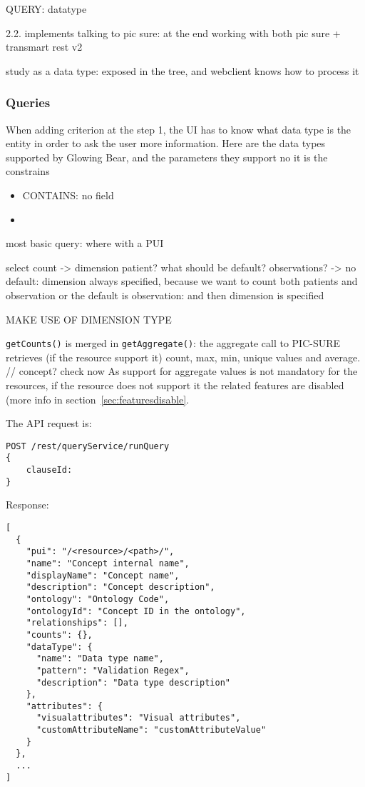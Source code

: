 QUERY: datatype


2.2. implements talking to pic sure: at the end working with both pic sure + transmart rest v2 

study as a data type: exposed in the tree, and webclient knows how to process it 

\subsubsection{Queries}

When adding criterion at the step 1, the UI has to know what data type is the entity in order to ask the user more information. Here are the data types supported by Glowing Bear, and the parameters they support no it is the constrains
\begin{itemize}
    \item CONTAINS: no field
    \item 
\end{itemize}


most basic query: where with a PUI

select count 
-> dimension patient? what should be default? observations? 
-> no default: dimension always specified, because we want to count both patients and observation 
or the default is observation: and then dimension is specified 

MAKE USE OF DIMENSION TYPE

\verb|getCounts()| is merged in \verb|getAggregate()|: the aggregate call to PIC-SURE retrieves (if the resource support it) count, max, min, unique values and average. // concept? check now
As support for aggregate values is not mandatory for the resources, if the resource does not support it the related features are disabled (more info in section~\ref{sec:featuresdisable}.


The API request is:
\begin{verbatim}
POST /rest/queryService/runQuery
{
    clauseId: 
}
\end{verbatim}

Response:
\begin{verbatim}
[
  {
    "pui": "/<resource>/<path>/",
    "name": "Concept internal name",
    "displayName": "Concept name",
    "description": "Concept description",
    "ontology": "Ontology Code",
    "ontologyId": "Concept ID in the ontology",
    "relationships": [],
    "counts": {},
    "dataType": {
      "name": "Data type name",
      "pattern": "Validation Regex",
      "description": "Data type description"
    },
    "attributes": {
      "visualattributes": "Visual attributes",
      "customAttributeName": "customAttributeValue"
    }
  },
  ...
]
\end{verbatim}


